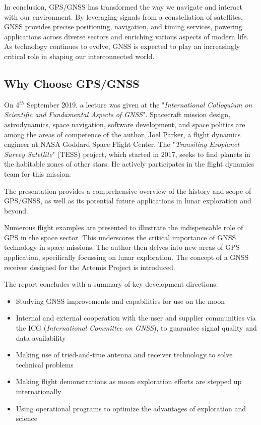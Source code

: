 In conclusion, GPS/GNSS has transformed the way we navigate and interact with our environment. By leveraging signals from a constellation of satellites, GNSS provides precise positioning, navigation, and timing services, powering applications across diverse sectors and enriching various aspects of modern life. As technology continues to evolve, GNSS is expected to play an increasingly critical role in shaping our interconnected world.

\subsection{Why Choose GPS/GNSS}
On 4$^{th}$ September 2019, a lecture\cite{RN146} was given at the "\textit{International Colloquium on Scientific and Fundamental Aspects of GNSS}". Spacecraft mission design, astrodynamics, space navigation, software development, and space politics are among the areas of competence of the author, Joel Parker, a flight dynamics engineer at NASA Goddard Space Flight Center. The "\textit{Transiting Exoplanet Survey Satellite}" (TESS) project, which started in 2017, seeks to find planets in the habitable zones of other stars. He actively participates in the flight dynamics team for this mission.

The presentation provides a comprehensive overview of the history and scope of GPS/GNSS, as well as its potential future applications in lunar exploration and beyond.

Numerous flight examples are presented to illustrate the indispensable role of GPS in the space sector. This underscores the critical importance of GNSS technology in space missions. The author then delves into new areas of GPS application, specifically focussing on lunar exploration. The concept of a GNSS receiver designed for the Artemis Project is introduced.

The report concludes with a summary of key development directions:
\begin{itemize}
    \item Studying GNSS improvements and capabilities for use on the moon
    \item Internal and external cooperation with the user and supplier communities via the ICG (\textit{International Committee on GNSS}), to guarantee signal quality and data availability
    \item Making use of tried-and-true antenna and receiver technology to solve technical problems
    \item Making flight demonstrations as moon exploration efforts are stepped up internationally
    \item Using operational programs to optimize the advantages of exploration and science
\end{itemize}

